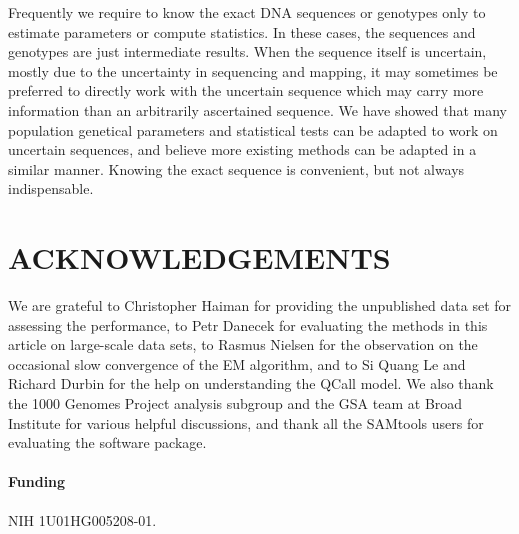 \documentclass{bioinfo}
\begin{document}
Frequently we require to know the exact DNA sequences or genotypes only to
estimate parameters or compute statistics. In these cases, the sequences and
genotypes are just intermediate results. When the sequence itself is uncertain,
mostly due to the uncertainty in sequencing and mapping, it may sometimes be
preferred to directly work with the uncertain sequence which may carry more
information than an arbitrarily ascertained sequence. We have showed that many
population genetical parameters and statistical tests can be adapted to work on
uncertain sequences, and believe more existing methods can be adapted in a
similar manner. Knowing the exact sequence is convenient, but not always
indispensable.

\section*{ACKNOWLEDGEMENTS}
We are grateful to Christopher Haiman for providing the unpublished data set
for assessing the performance, to Petr Danecek for evaluating the methods in
this article on large-scale data sets, to Rasmus Nielsen for the observation on
the occasional slow convergence of the EM algorithm, and to Si Quang Le and
Richard Durbin for the help on understanding the QCall model.  We also thank
the 1000 Genomes Project analysis subgroup and the GSA team at Broad Institute
for various helpful discussions, and thank all the SAMtools users for
evaluating the software package.

\paragraph{Funding\textcolon} NIH 1U01HG005208-01.

\end{document}

